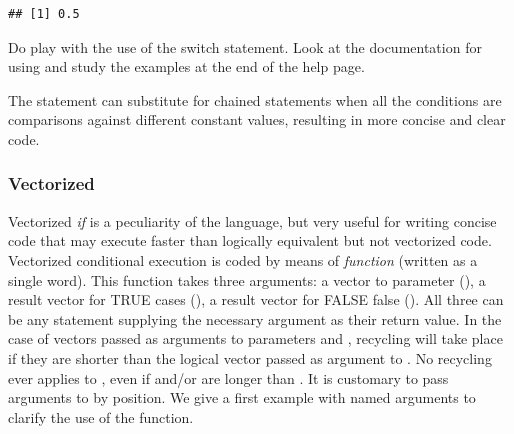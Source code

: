 \documentclass[krantz2]{krantz}\usepackage{knitr}%
\begin{document}
\begin{knitrout}\footnotesize
{}\color{fgcolor}\begin{kframe}
\begin{alltt}
 \hlkwb{<-} 
 \hlkwb{<-} 
             \hlstd{=} \hlstd{,}
             \hlstd{=}  \hlopt{/} \hlstd{,}
             \hlstd{=}  \hlopt{/} \hlstd{,}
\hlstd{)}
\end{alltt}
\begin{verbatim}
## [1] 0.5
\end{verbatim}
\end{kframe}
\end{knitrout}

\begin{playground}
    Do play with the use of the switch statement. Look at the documentation for  using  and study the examples at the end of the help page.
\end{playground}

The  statement can substitute for chained  statements when all the conditions are comparisons against different constant values, resulting in more concise and clear code.

\subsubsection[Vectorized \texttt{ifelse()}]{Vectorized }
Vectorized \emph{if} is a peculiarity of the \Rlang language, but very useful for writing concise code that may execute faster than logically equivalent but not vectorized code.
Vectorized conditional execution is coded by means of \emph{function}  (written as a single word). This function takes three arguments: a  vector to parameter (), a result vector for TRUE cases (), a result vector for FALSE false (). All three can be any \Rlang statement supplying the necessary argument as their return value. In the case of vectors passed as arguments to parameters  and , recycling will take place if they are shorter than the logical vector passed as argument to . No recycling ever applies to , even if  and/or  are longer than . It is customary to pass arguments to  by position. We give a first example with named arguments to clarify the use of the function.
\end{document}
